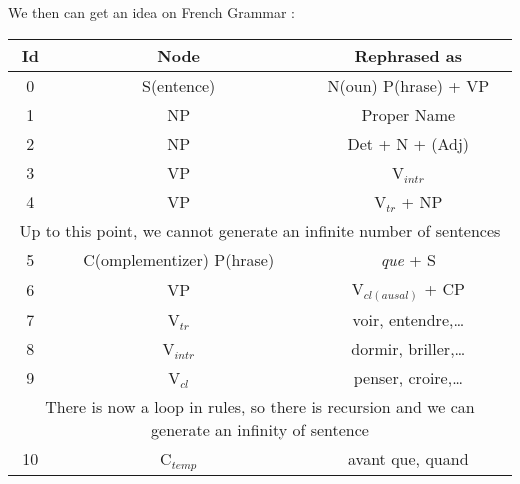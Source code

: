 \documentclass{cours}
\begin{document}
We then can get an idea on French Grammar\! :
\begin{center}
    \begin{tabular}{cc@{$\ \longrightarrow\ $}c}
        \toprule
        Id                                      & Node                            & Rephrased as                            \\
        \midrule
        0                                       & S(entence)                      & N(oun) P(hrase) + VP                    \\
        1                                       & NP                              & Proper Name                             \\
        2                                       & NP                              & Det + N + (Adj)                         \\
        3                                       & VP                              & V$_{intr}$                              \\
        4                                       & VP                              & V$_{tr}$ + NP                           \\
        \midrule
        \multicolumn{3}{c}{Up to this point, we cannot generate an infinite number of sentences}                            \\
        \midrule
        5                                       & C(omplementizer) P(hrase)       & \textsl{que} + S                        \\
        6                                       & VP                              & V$_{cl(ausal)}$ + CP                    \\
        7                                       & V$_{tr}$                        & voir, entendre,\dots                    \\
        8                                       & V$_{intr}$                      & dormir, briller,\dots                   \\
        9                                       & V$_{cl}$                        & penser, croire,\dots                    \\
        \midrule
        \multicolumn{3}{c}{There is now a loop in rules, so there is recursion and we can generate an infinity of sentence} \\
        \midrule
        10                                      & C$_{temp}$                      & avant que, quand                        \\

\end{tabular}
\end{center}
\end{document}
